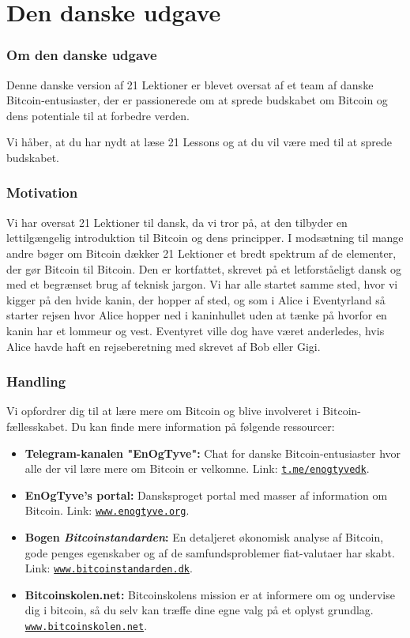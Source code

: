 \part{Den danske udgave}

\section*{Om den danske udgave}

Denne danske version af 21 Lektioner er blevet oversat af et team af
danske Bitcoin-entusiaster, der er passionerede om at sprede budskabet
om Bitcoin og dens potentiale til at forbedre verden.

Vi håber, at du har nydt at læse 21 Lessons og at du vil være med til at
sprede budskabet.

\section*{Motivation}

Vi har oversat 21 Lektioner til dansk, da vi tror på, at den tilbyder en
lettilgængelig introduktion til Bitcoin og dens principper. I modsætning
til mange andre bøger om Bitcoin dækker 21 Lektioner et bredt spektrum
af de elementer, der gør Bitcoin til Bitcoin. Den er kortfattet, skrevet
på et letforståeligt dansk og med et begrænset brug af teknisk jargon.
Vi har alle startet samme sted, hvor vi kigger på den hvide kanin, der
hopper af sted, og som i Alice i Eventyrland så starter rejsen hvor
Alice hopper ned i kaninhullet uden at tænke på hvorfor en kanin har et
lommeur og vest. Eventyret ville dog have været anderledes, hvis Alice
havde haft en rejseberetning med skrevet af Bob eller Gigi.
\newpage
\section*{Handling}

Vi opfordrer dig til at lære mere om Bitcoin og blive involveret i
Bitcoin-fællesskabet. Du kan finde mere information på følgende
ressourcer:

\begin{itemize}
\item \textbf{Telegram-kanalen "EnOgTyve":} Chat for danske Bitcoin-entusiaster hvor alle der vil lære mere om Bitcoin er velkomne. Link: \href{https://t.me/enogtyvedk}{\texttt{t.me/enogtyvedk}}.
\item \textbf{EnOgTyve's portal:} Dansksproget portal med masser af information om Bitcoin. Link: \href{https://www.enogtyve.org/}{\texttt{www.enogtyve.org}}.
\item \textbf{Bogen \textit{Bitcoinstandarden}:} En detaljeret økonomisk analyse af Bitcoin, gode penges egenskaber og af de samfundsproblemer fiat-valutaer har skabt. \newline Link: \href{https://www.bitcoinstandarden.dk/}{\texttt{www.bitcoinstandarden.dk}}.
\item \textbf{Bitcoinskolen.net:} Bitcoinskolens mission er at informere om og undervise dig i bitcoin, så du selv kan træffe dine egne valg på et oplyst grundlag. \href{https://www.bitcoinskolen.net/}{\texttt{www.bitcoinskolen.net}}.
\end{itemize}

